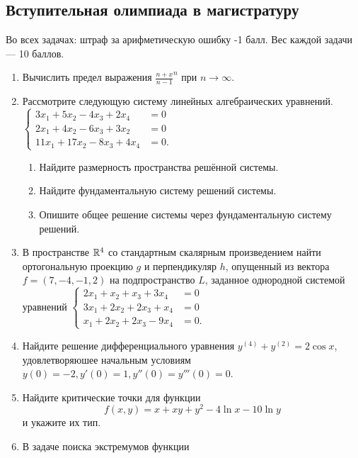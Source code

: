 \documentclass[pdftex,12pt,a4paper]{article}
\begin{document}
\subsection{Вступительная олимпиада в магистратуру}
Во всех задачах: штраф за арифметическую ошибку -1 балл. Вес каждой задачи --- 10 баллов.
\begin{enumerate}
\item Вычислить предел выражения $\frac{n+x}{n-1}^n$ при $n\to \infty$.\\
\item Рассмотрите следующую систему линейных алгебраических уравнений.\\
$\left\{
\begin{aligned}
3x_1+5x_2-4x_3+2x_4 &=0\\
2x_1+4x_2-6x_3+3x_2 &=0\\
11x_1+17x_2-8x_3+4x_4&=0.
\end{aligned}\right.$\\
\begin{enumerate}
\item Найдите размерность пространства решённой системы.
\item Найдите фундаментальную систему решений системы.
\item Опишите общее решение системы через фундаментальную систему решений.
\end{enumerate}
\item В пространстве $\mathbb R^4$ со стандартным скалярным произведением найти ортогональную проекцию $g$ и перпендикуляр $h$, опущенный из вектора $f=(7,-4,-1,2)$ на подпространство $L$, заданное однородной системой уравнений 
$\left\{\begin{aligned}
2x_1+x_2+x_3+3x_4 &=0\\
3x_1+2x_2+2x_3+x_4 &=0\\
x_1+2x_2+2x_3-9x_4 &=0.
\end{aligned}\right.$\\
\item Найдите решение дифференциального уравнения $y^{(4)}+y^{(2)}=2\cos x$, удовлетворяюшее начальным условиям $y(0)=-2, y'(0)=1, y''(0)=y'''(0)=0$.\\
\item Найдите критические точки для функции
\begin{equation}
f(x,y)=x+xy+y^2-4\ln x-10\ln y
\end{equation}
и укажите их тип.\\
\item В задаче поиска экстремумов функции 

\end{enumerate}
\end{document}
